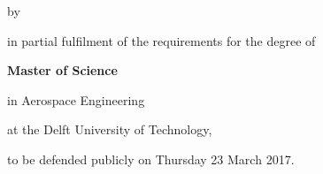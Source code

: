 \begin{titlepage}

\begin{center}


\vspace*{2\bigskipamount}

{\makeatletter
\titlestyle\color{tudelft-cyan}\Huge\@title
\makeatother}

{\makeatletter
\ifx\@subtitle\undefined\else
    \bigskip
    \titlefont\titleshape\LARGE\@subtitle
\fi
\makeatother}

\bigskip
\bigskip

by

\bigskip
\bigskip

{\makeatletter
\titlefont\Large\bfseries\@author
\makeatother}

\vfill

in partial fulfilment of the requirements for the degree of

\bigskip
\bigskip

{\bfseries Master of Science}

in Aerospace Engineering

\bigskip
\bigskip

at the Delft University of Technology,

to be defended publicly on Thursday 23 March 2017.



\end{center}
\end{titlepage}
